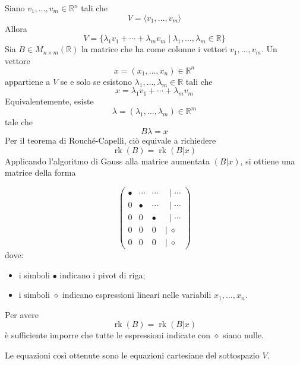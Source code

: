 \documentclass[
  a4paper,
]{article}
\providecommand{\tightlist}{%
  \setlength{\itemsep}{0pt}\setlength{\parskip}{0pt}}
\providecommand{\tightlist}{}
\begin{document}
Siano \(v_1,\dots,v_m\in\mathbb{R}^n\) tali che \[
V=\langle v_1,\dots,v_m\rangle
\] Allora \[
V=
\{
\lambda_1 v_1 +\cdots+\lambda_m v_m
\mid
\lambda_1,\dots,\lambda_m \in\mathbb{R}
\}
\] Sia \(B\in M_{n\times m}(\mathbb{R})\) la matrice che ha come colonne
i vettori \(v_1,\dots,v_m\). Un vettore \[
x=(x_1,\dots,x_n)\in\mathbb{R}^n
\] appartiene a \(V\) se e solo se esistono
\(\lambda_1,\dots,\lambda_m\in\mathbb{R}\) tali che \[
x=\lambda_1v_1+\cdots+\lambda_mv_m
\] Equivalentemente, esiste \[
\lambda=(\lambda_1,\dots,\lambda_m)\in\mathbb{R}^m
\] tale che \[
B\lambda=x
\] Per il teorema di Rouché-Capelli, ciò equivale a richiedere \[
\operatorname{rk}(B)=\operatorname{rk}(B|x)
\] Applicando l'algoritmo di Gauss alla matrice aumentata \((B|x)\), si
ottiene una matrice della forma

\[
\begin{pmatrix}
\bullet & \cdots & \cdots & \;\;|\;\cdots \\
0 & \bullet & \cdots & \;\;|\;\cdots \\
0 & 0 & \bullet & \;\;|\;\cdots \\
0 & 0 & 0 & |\;\diamond \\
0 & 0 & 0 & |\;\diamond
\end{pmatrix}
\] dove:

\begin{itemize}
\tightlist
\item
  i simboli \(\bullet\) indicano i pivot di riga;
\item
  i simboli \(\diamond\) indicano espressioni lineari nelle variabili
  \(x_1,\dots,x_n\).
\end{itemize}

Per avere \[
\operatorname{rk}(B)=\operatorname{rk}(B|x)
\] è sufficiente imporre che tutte le espressioni indicate con
\(\diamond\) siano nulle.

Le equazioni così ottenute sono le equazioni cartesiane del sottospazio
\(V\).
\end{document}
